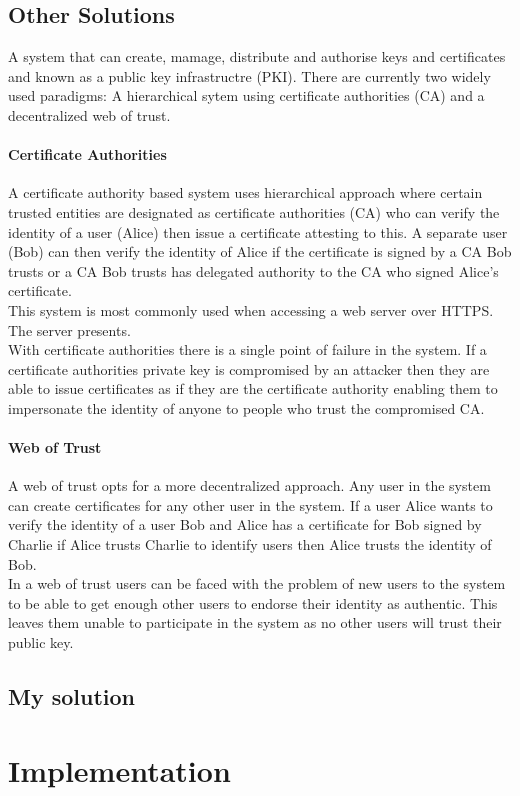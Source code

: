 \documentclass[12pt, a4paper]{article}
\begin{document}
\subsection{Other Solutions}
A system that can create, mamage, distribute and authorise keys and certificates and known as a public key infrastructre (PKI). There are currently two widely used paradigms: A hierarchical sytem using certificate authorities (CA) and a decentralized web of trust.
\paragraph{Certificate Authorities}
A certificate authority based system uses hierarchical approach where certain trusted entities are designated as certificate authorities (CA) who can verify the identity of a user (Alice) then issue a certificate attesting to this. A separate user (Bob) can then verify the identity of Alice if the certificate is signed by a CA Bob trusts or a CA Bob trusts has delegated authority to the CA who signed Alice's certificate.\\
This system is most commonly used when accessing a web server over HTTPS\@. The server presents.\\
With certificate authorities there is a single point of failure in the system. If a certificate authorities private key is compromised by an attacker then they are able to issue certificates as if they are the certificate authority enabling them to impersonate the identity of anyone to people who trust the compromised CA.\@
\paragraph{Web of Trust}
A web of trust opts for a more decentralized approach. Any user in the system can create certificates for any other user in the system. If a user Alice wants to verify the identity of a user Bob and Alice has a certificate for Bob signed by Charlie if Alice trusts Charlie to identify users then Alice trusts the identity of Bob.\\
In a web of trust users can be faced with the problem of new users to the system to be able to get enough other users to endorse their identity as authentic. This leaves them unable to participate in the system as no other users will trust their public key. 
\subsection{My solution}
\section{Implementation}
\end{document}

